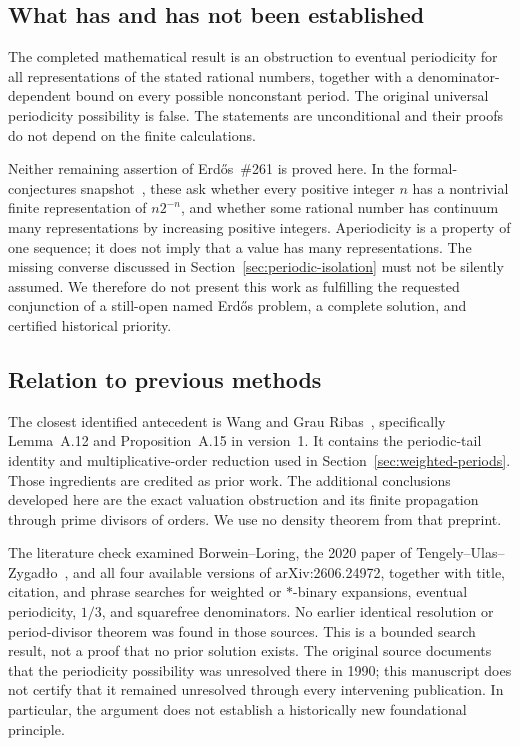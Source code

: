 \documentclass[11pt]{article}
\theoremstyle{definition}
\theoremstyle{remark}
\begin{document}
\subsection{What has and has not been established}
The completed mathematical result is an obstruction to eventual
periodicity for all representations of the stated rational numbers,
together with a denominator-dependent bound on every possible
nonconstant period. The original universal periodicity possibility
is false. The statements are unconditional and their proofs do not
depend on the finite calculations.

Neither remaining assertion of Erd\H{o}s~\#261 is proved here. In the
formal-conjectures snapshot~\cite{Formal261}, these ask whether every
positive integer $n$ has a nontrivial finite representation of $n2^{-n}$,
and whether some rational number has continuum many representations
by increasing positive integers. Aperiodicity is a property of one
sequence; it does not imply that a value has many representations.
The missing converse discussed in Section~\ref{sec:periodic-isolation}
must not be silently assumed. We therefore do not present this work
as fulfilling the requested conjunction of a still-open named
Erd\H{o}s problem, a complete solution, and certified historical priority.

\subsection{Relation to previous methods}
The closest identified antecedent is Wang and Grau Ribas~\cite{Wang2026v1},
specifically Lemma~A.12 and Proposition~A.15 in version~1. It contains
the periodic-tail identity and multiplicative-order reduction used in
Section~\ref{sec:weighted-periods}. Those ingredients are credited as
prior work. The additional conclusions developed here are the exact
valuation obstruction and its finite propagation through prime
divisors of orders. We use no density theorem from that preprint.

The literature check examined Borwein--Loring, the 2020 paper of
Tengely--Ulas--Zygad\l{}o~\cite{TUZ2020}, and all four available versions
of arXiv:2606.24972, together with title, citation, and phrase searches
for weighted or $*$-binary expansions, eventual periodicity, $1/3$,
and squarefree denominators. No earlier identical resolution or
period-divisor theorem was found in those sources. This is a bounded
search result, not a proof that no prior solution exists. The original
source documents that the periodicity possibility was unresolved there
in 1990; this manuscript does not certify that it remained unresolved
through every intervening publication. In particular, the argument
does not establish a historically new foundational principle.
\end{document}

